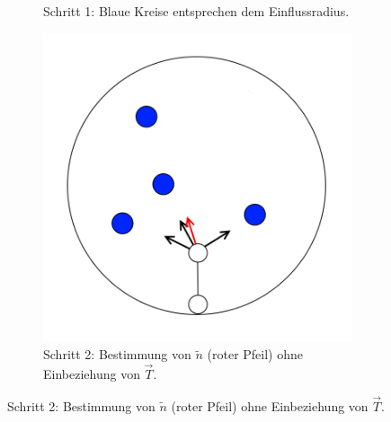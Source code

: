 \begin{figure} [hbtp]
\begin{subfigure}[t]{.3\textwidth}
		\caption{Schritt 1: Blaue Kreise entsprechen dem Einflussradius.}
		\label{subfig:SCA_Basic2}
	\end{subfigure}
	\hspace{.03\textwidth}
	\begin{subfigure}[t]{.3\textwidth}
		\centering
		\includegraphics[width=\linewidth]{images/SCA_Basic3.png}
		\caption{Schritt 2: Bestimmung von $\tilde{n}$ (roter Pfeil) ohne Einbeziehung von $\overrightarrow{T}$.}
		\label{subfig:SCA_Basic3}
	\end{subfigure}


\end{figure}

